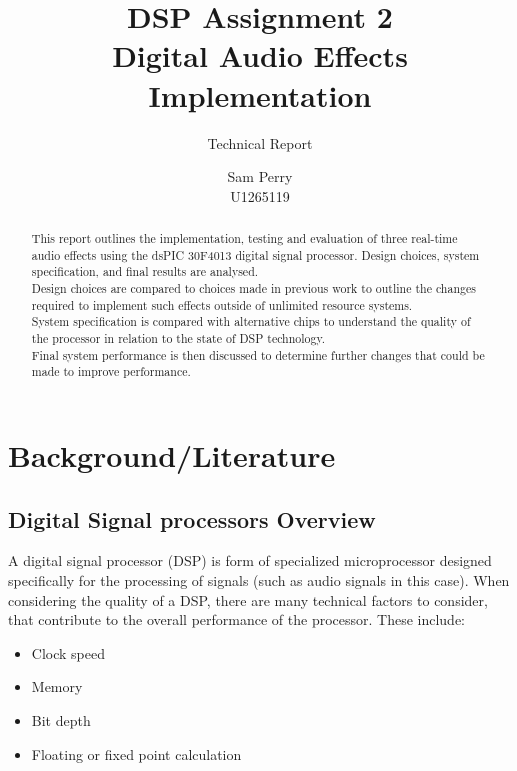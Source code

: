 \documentclass{scrartcl}
\begin{document}
    \title{DSP Assignment 2\\Digital Audio Effects Implementation}
    \subtitle{Technical Report}
    \author{Sam Perry\\U1265119}
    \date{}
    \maketitle

    \begin{abstract}
        This report outlines the implementation, testing and evaluation of
        three real-time audio effects using the dsPIC 30F4013 digital signal
        processor.  Design choices, system specification, and final results
        are analysed.\\
        Design choices are compared to choices made in previous work to outline
        the changes required to implement such effects outside of
        unlimited resource systems.\\
        System specification is compared with alternative chips to understand
        the quality of the processor in relation to the state of DSP
        technology.\\
        Final system performance is then discussed to determine further
        changes that could be made to improve performance.
    \end{abstract}

    \section{Background/Literature}
    \subsection{Digital Signal processors Overview}
    A digital signal processor (DSP) is form of specialized microprocessor
    designed specifically for the processing of signals (such as audio signals
    in this case). When considering the quality of a DSP, there are many
    technical factors to consider, that contribute to the overall performance
    of the processor. These include:
    \begin{itemize}
        \item Clock speed
        \item Memory
        \item Bit depth
        \item Floating or fixed point calculation
    \end{itemize}
\end{document}
